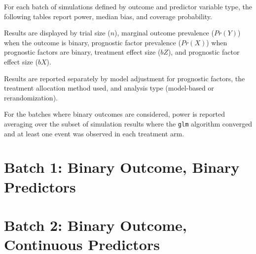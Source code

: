 For each batch of simulations defined by outcome and predictor variable type, the following tables report power, median bias, and coverage probability.

Results are displayed by trial size ($n$), marginal outcome prevalence ($Pr( Y )$) when the outcome is binary, prognostic factor prevalence ($Pr( X )$) when prognostic factors are binary, treatment effect size ($bZ$), and prognostic factor effect size ($bX$).

Results are reported separately by model adjustment for prognostic factors, the treatment allocation method used, and analysis type (model-based or rerandomization).

For the batches where binary outcomes are considered, power is reported averaging over the subset of simulation results where the \texttt{glm} algorithm converged and at least one event was observed in each treatment arm.

\section[Binary Y, binary X]{Batch 1: Binary Outcome, Binary Predictors}


 \newpage 
 \newpage
 \newpage

 \newpage 


\section[Binary Y, continuous X]{Batch 2: Binary Outcome, Continuous Predictors}


 \newpage 
 \newpage
 \newpage

 \newpage 

